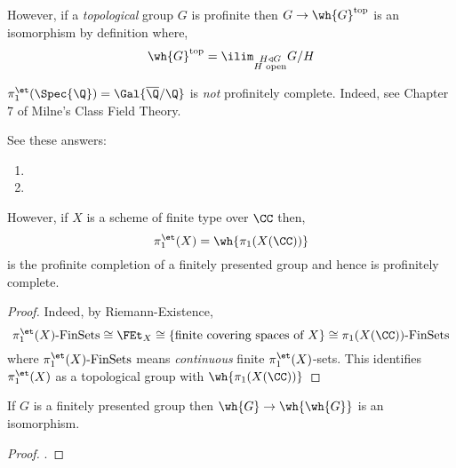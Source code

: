 \documentclass[12pt]{article}
\begin{document}
\begin{rmk}
However, if a \textit{topological} group $G$ is profinite then $G \to \wh{G}^{\text{top}}$ is an isomorphism by definition where,
\[ \wh{G}^{\text{top}} = \ilim_{\substack{H \triangleleft G \\ H \text{ open}}} G/H \]
\end{rmk}

\begin{example}
$\pi_1^{\et}(\Spec{\Q}) = \Gal{\overline{\Q}/\Q}$ is \textit{not} profinitely complete. Indeed, see Chapter 7 of Milne's Class Field Theory.
\end{example}

\begin{rmk}
See these answers:
\begin{enumerate}
\item {}

\item {}
\end{enumerate}
\end{rmk}

\begin{prop}
However, if $X$ is a scheme of finite type over $\CC$ then,
\[ \pi_1^{\et}(X) = \wh{\pi_1(X(\CC))} \]
is the profinite completion of a finitely presented group and hence is profinitely complete.
\end{prop}

\begin{proof}
Indeed, by Riemann-Existence,
\[ \pi_1^{\et}(X)\text{-FinSets} \cong \FEt_X \cong \{ \text{finite covering spaces of } X \} \cong \pi_1(X(\CC))\text{-FinSets} \]
where $\pi_1^{\et}(X)\text{-FinSets}$ means \textit{continuous} finite $\pi_1^{\et}(X)$-sets. This identifies $\pi_1^{\et}(X)$ as a topological group with $\wh{\pi_1(X(\CC))}$
\end{proof}

\begin{lemma}
If $G$ is a finitely presented group then $\wh{G} \to \wh{\wh{G}}$ is an isomorphism.
\end{lemma}

\begin{proof}
.
\end{proof}
\end{document}
